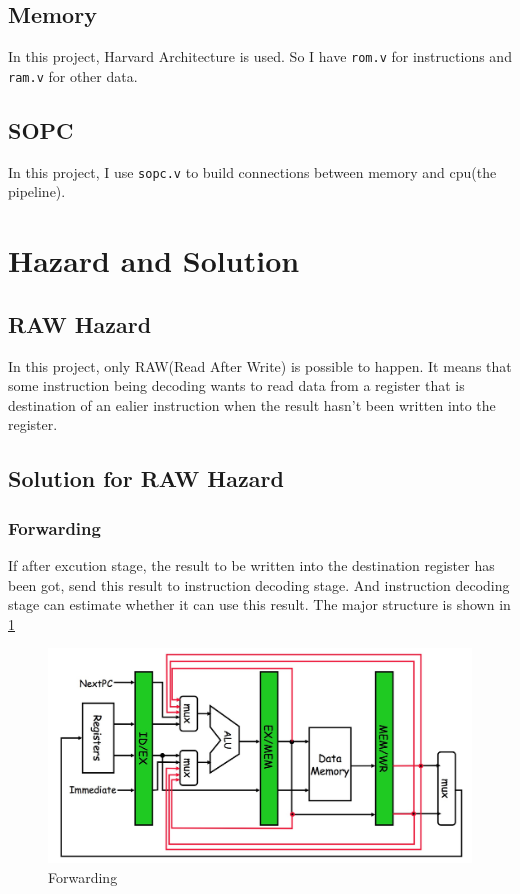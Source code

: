\documentclass[paper=a4, fontsize=11pt]{scrartcl} %
\numberwithin{equation}{section} %
\numberwithin{figure}{section} %
\numberwithin{table}{section} %
\begin{document}
\begin{spacing}{1.5}
	\subsection{Memory}
		In this project, Harvard Architecture is used. So I have \verb|rom.v| for instructions and \verb|ram.v| for other data.
	\subsection{SOPC}
		In this project, I use \verb|sopc.v| to build connections between memory and cpu(the pipeline).
\section{Hazard and Solution}
	\subsection{RAW Hazard}
	In this project, only RAW(Read After Write) is possible to happen. It means that some instruction being decoding wants to read data from a register that is  destination of an ealier instruction when the result hasn't been written into the register.
	\subsection{Solution for RAW Hazard}
		\subsubsection{Forwarding}
			If after excution stage, the result to be written into the destination register has been got, send this result to instruction decoding stage. And instruction decoding stage can estimate whether it can use this result. The major structure is shown in \ref{fig::forwarding}
			\begin{figure}[H]
				\centering
				\includegraphics[width = 13 cm]{forwarding}
				\caption{Forwarding}
				\label{fig::forwarding}
			\end{figure}
			

\end{spacing}
\end{document}
